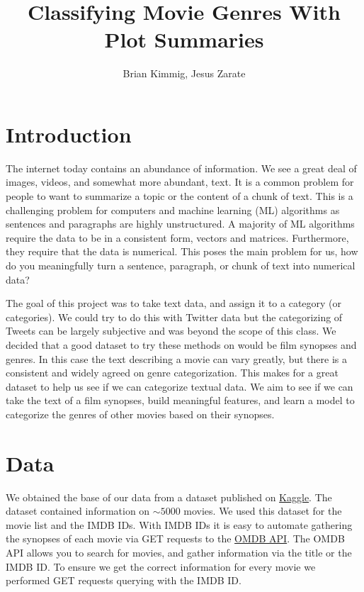 \documentclass[11pt]{article}
\title{Classifying Movie Genres With Plot Summaries}
\author{Brian Kimmig, Jesus Zarate}
\date{}
\begin{document}
\maketitle

\section{Introduction}
\label{sec:introduction}

The internet today contains an abundance of information. We see a great deal of images, videos, and somewhat more abundant, text. It is a common problem for people to want to summarize a topic or the content of a chunk of text. This is a challenging problem for computers and machine learning (ML) algorithms as sentences and paragraphs are highly unstructured. A majority of ML algorithms require the data to be in a consistent form, vectors and matrices. Furthermore, they require that the data is numerical. This poses the main problem for us, how do you meaningfully turn a sentence, paragraph, or chunk of text into numerical data?

The goal of this project was to take text data, and assign it to a category (or categories). We could try to do this with Twitter data but the categorizing of Tweets can be largely subjective and was beyond the scope of this class. We decided that a good dataset to try these methods on would be film synopses and genres. In this case the text describing a movie can vary greatly, but there is a consistent and widely agreed on genre categorization. This makes for a great dataset to help us see if we can categorize textual data. We aim to see if we can take the text of a film synopses, build meaningful features, and learn a model to categorize the genres of other movies based on their synopses. 

\section{Data}
\label{sec:data}

We obtained the base of our data from a dataset published on \href{https://www.kaggle.com/deepmatrix/imdb-5000-movie-dataset}{Kaggle}. The dataset contained information on $\sim5000$ movies. We used this dataset for the movie list and the IMDB IDs. With IMDB IDs it is easy to automate gathering the synopses of each movie via GET requests to the \href{https://www.omdbapi.com/}{OMDB API}. The OMDB API allows you to search for movies, and gather information via the title or the IMDB ID. To ensure we get the correct information for every movie we performed GET requests querying with the IMDB ID. 
\end{document}

